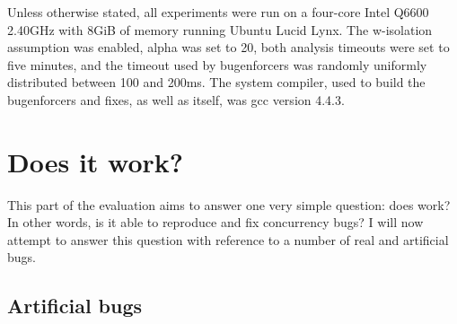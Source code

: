Unless otherwise stated, all experiments were run on a four-core Intel
Q6600 2.40GHz with 8GiB of memory running Ubuntu Lucid Lynx.  The
\gls{w-isolation} assumption was enabled, \gls{alpha} was set to 20,
both analysis timeouts were set to five minutes, and the timeout used
by \glspl{bugenforcer} was randomly uniformly distributed between 100
and 200ms.  The system compiler, used to build the \glspl{bugenforcer}
and fixes, as well as {\implementation} itself, was gcc version 4.4.3.

\section{Does it work?}
\label{sect:eval:does_it_work}

This part of the evaluation aims to answer one very simple question:
does {\technique} work?  In other words, is it able to reproduce and
fix concurrency bugs?  I will now attempt to answer this question with
reference to a number of real and artificial bugs.

\subsection{Artificial bugs}
\label{sect:eval:artificial_bugs}

\newenvironment{literalC}{\tt \begin{tabbing}}{\end{tabbing}\vspace{-12pt}{\hfill}}
\newcommand{\clbrace}{\{ \\ \hspace{3pt} \=\+ }
\newcommand{\crbrace}{\- \\ \}}

